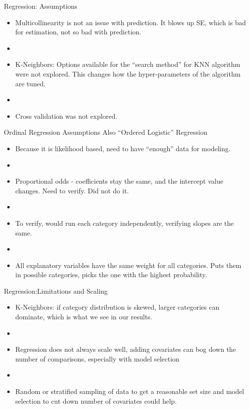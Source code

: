 \documentclass{beamer}
\begin{document}
\begin{frame}{Regression: Assumptions}
	\begin{itemize}
	\item Multicollinearity is not an issue with prediction. It blows up SE, which is bad for estimation, not so bad with prediction.
	\item[]
	\item K-Neighbors: Options available for the ``search method'' for KNN algorithm were not explored. This changes how the hyper-parameters of the algorithm are tuned.
	\item[]
	\item Cross validation was not explored.
	\end{itemize}
\end{frame}

\begin{frame}{Ordinal Regression Assumptions}
	Also ``Ordered Logistic'' Regression
	\begin{itemize}
	\item Because it is likelihood based, need to have ``enough'' data for modeling.
	\item[]
	\item Proportional odds - coefficients stay the same, and the intercept value changes. Need to verify. Did not do it.
	\item[]
	\item To verify, would run each category independently, verifying slopes are the same.
	\item[]
	\item All explanatory variables have the same weight for all categories. Puts them in possible categories, picks the one with the highest probability. 
	\end{itemize}
\end{frame}

\begin{frame}{Regression:Limitations and Scaling}
	\begin{itemize}
	\item K-Neighbors: if category distribution is skewed, larger categories can dominate, which is what we see in our results.
	\item[]
	\item Regression does not always scale well, adding covariates can bog down the number of comparisons, especially with model selection
	\item[]
	\item Random or stratified sampling of data to get a reasonable set size and model selection to cut down number of covariates could help.
	\end{itemize}
\end{frame}
\end{document}
